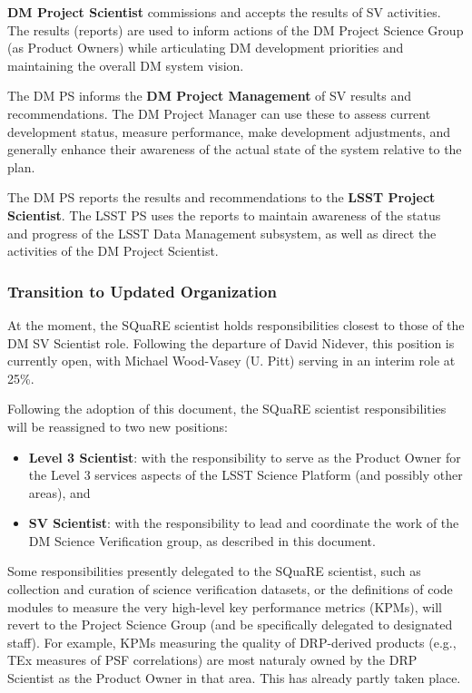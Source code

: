{\bf DM Project Scientist} commissions and accepts the results of SV
activities.  The results (reports) are used to inform actions of the DM
Project Science Group (as Product Owners) while articulating DM development
priorities and maintaining the overall DM system vision.

The DM PS informs the {\bf DM Project Management} of SV results and recommendations. 
The DM Project Manager can use these to assess current development
status, measure performance, make development adjustments, and generally
enhance their awareness of the actual state of the system relative to
the plan.

The DM PS reports the results and recommendations to the {\bf LSST Project
Scientist}. The LSST PS uses the reports to maintain awareness of the
status and progress of the LSST Data Management subsystem, as well as direct
the activities of the DM Project Scientist.

\subsubsection{Transition to Updated Organization}

At the moment, the SQuaRE scientist holds responsibilities closest to those
of the DM SV Scientist role.  Following the departure of David Nidever, this
position is currently open, with Michael Wood-Vasey (U.  Pitt) serving in an
interim role at 25\%.

Following the adoption of this document, the SQuaRE scientist
responsibilities will be reassigned to two new positions:
%
\begin{itemize}
\item {\bf Level 3 Scientist}: with the responsibility to serve as the Product Owner
for the Level 3 services aspects of the LSST Science Platform (and possibly
other areas), and
\item {\bf SV Scientist}: with the responsibility to lead and coordinate the work
of the DM Science Verification group, as described in this document.
\end{itemize}
%
Some responsibilities presently delegated to the SQuaRE scientist, such as
collection and curation of science verification datasets, or the definitions
of code modules to measure the very high-level key performance metrics
(KPMs), will revert to the Project Science Group (and be specifically
delegated to designated staff).  For example, KPMs measuring the quality
of DRP-derived products (e.g., TEx measures of PSF correlations) are most
naturaly owned by the DRP Scientist as the Product Owner in that area. 
This has already partly taken place.

